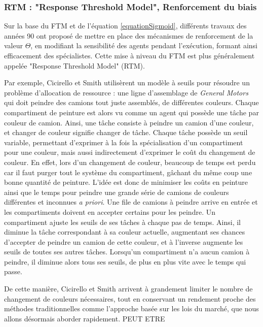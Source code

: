         \subsubsection{RTM : "Response Threshold Model", Renforcement du biais}
        Sur la base du FTM et de l'équation \ref{equationSigmoid}, différents travaux des années 90 \cite{theraulaz_response_1998,carbonell_multi-agent_1994} ont proposé de mettre en place des mécanismes de renforcement de la valeur $\Theta$, en modifiant la sensibilité des agents pendant l'exécution, formant ainsi efficacement des spécialistes. Cette mise à niveau du FTM est plus généralement appelée "Response Threshold Model" (RTM).
        
        Par exemple, Cicirello et Smith \cite{cicirello_wasp-like_2004} utilisèrent un modèle à seuils pour résoudre un problème d'allocation de ressource : une ligne d'assemblage de \textit{General Motors} qui doit peindre des camions tout juste assemblés, de différentes couleurs. Chaque compartiment de peinture est alors vu comme un agent qui possède une tâche par couleur de camion. Ainsi, une tâche consiste à peindre un camion d'une couleur, et changer de couleur signifie changer de tâche. Chaque tâche possède un seuil variable, permettant d'exprimer à la fois la spécialisation d'un compartiment pour une couleur, mais aussi indirectement d'exprimer le coût du changement de couleur. En effet, lors d'un changement de couleur, beaucoup de temps est perdu car il faut purger tout le système du compartiment, gâchant du même coup une bonne quantité de peinture. L'idée est donc de minimiser les coûts en peinture ainsi que le temps pour peindre une grande série de camions de couleurs différentes et inconnues \textit{a priori}. Une file de camions à peindre arrive en entrée et les compartiments doivent en accepter certains pour les peindre. Un compartiment ajuste les seuils de ses tâches à chaque pas de temps. Ainsi, il diminue la tâche correspondant à sa couleur actuelle, augmentant ses chances d'accepter de peindre un camion de cette couleur, et à l'inverse augmente les seuils de toutes ses autres tâches. Lorsqu'un compartiment n'a aucun camion à peindre, il diminue alors tous ses seuils, de plus en plus vite avec le temps qui passe.
        
        De cette manière, Cicirello et Smith arrivent à grandement limiter le nombre de changement de couleurs nécessaires, tout en conservant un rendement proche des méthodes traditionnelles comme l'approche basée sur les lois du marché, que nous allons désormais aborder rapidement. PEUT ETRE
        
